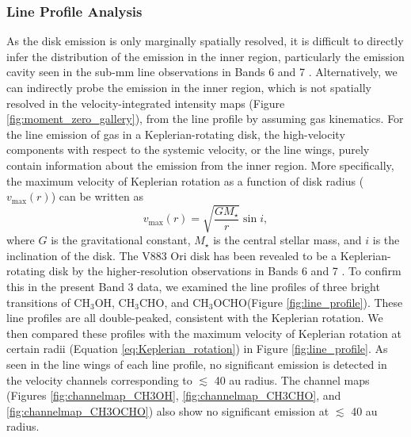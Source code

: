 \documentclass[twocolumn, twocolappendix, astrosymb, times]{aastex631}
\newcommand{\methanol}{CH$_3$OH\xspace}
\newcommand{\acetaldehyde}{CH$_3$CHO\xspace}
\newcommand{\methylformate}{CH$_3$OCHO\xspace}
\begin{document}
\subsubsection{Line Profile Analysis}\label{subsubsec:line_profile_analysis}
As the disk emission is only marginally spatially resolved, it is difficult to directly infer the distribution of the emission in the inner region, particularly the emission cavity seen in the sub-mm line observations in Bands 6 and 7 \citep{vantHoff2018, Lee2019, Tobin2023}. Alternatively, we can indirectly probe the emission in the inner region, which is not spatially resolved in the velocity-integrated intensity maps (Figure \ref{fig:moment_zero_gallery}), from the line profile by assuming gas kinematics. 
For the line emission of gas in a Keplerian-rotating disk, the high-velocity components with respect to the systemic velocity, or the line wings, purely contain information about the emission from the inner region. More specifically, the maximum velocity of Keplerian rotation as a function of disk radius ($v_\mathrm{max}(r)$) can be written as 
\begin{equation}\label{eq:Keplerian_rotation}
    v_\mathrm{max}(r) = \sqrt{\frac{GM_\star}{r}}\sin i,
\end{equation}
where $G$ is the gravitational constant, $M_\star$ is the central stellar mass, and $i$ is the inclination of the disk. The V883 Ori disk has been revealed to be a Keplerian-rotating disk by the higher-resolution observations in Bands 6 and 7 \citep{Cieza2016, Lee2019}. To confirm this in the present Band 3 data, we examined the line profiles of three bright transitions of \methanol, \acetaldehyde, and \methylformate (Figure \ref{fig:line_profile}). These line profiles are all double-peaked, consistent with the Keplerian rotation. We then compared these profiles with the maximum velocity of Keplerian rotation at certain radii (Equation \ref{eq:Keplerian_rotation}) in Figure \ref{fig:line_profile}. As seen in the line wings of each line profile, no significant emission is detected in the velocity channels corresponding to $\lesssim$ 40 au radius. The channel maps (Figures \ref{fig:channelmap_CH3OH}, \ref{fig:channelmap_CH3CHO}, and \ref{fig:channelmap_CH3OCHO}) also show no significant emission at $\lesssim$ 40 au radius. 


\begin{figure*}
\caption{Line profiles of \methanol $2_{-1,1}$ -- $1_{-1,0}$ E $v_t=0$, \acetaldehyde $5_{2,3}$ -- $4_{2,2}$ E $v_t=0$, and \methylformate $7_{6,1}$ -- $6_{6,0}$ E $v_t=0$. The vertical gray  dotted line marks the systemic velocity (4.25 km s$^{-1}$). The vertical blue dashed lines indicate the corresponding disk radii at each velocity channel based on the maximum velocity of Keplerian rotation in Equation (\ref{eq:Keplerian_rotation}). The horizontal gray dashed line indicates the zero-flux level. There are no significant emission at the velocity channels which corresponds to inside $\sim$ 40\,au radius.}
\label{fig:line_profile}
\end{figure*}
\end{document}
